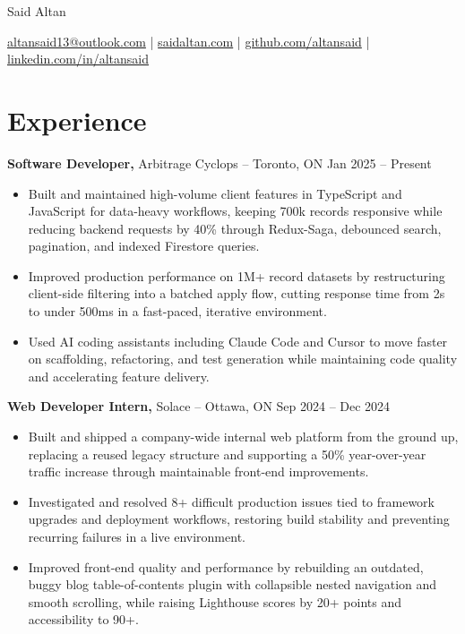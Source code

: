 \documentclass[11pt]{article}       %
\begin{document}
\centerline{\Huge Said Altan}

\vspace{10pt}

\centerline{\href{mailto:altansaid13@outlook.com}{altansaid13@outlook.com} | \href{https://saidaltan.com}{saidaltan.com} | \href{https://github.com/altansaid}{github.com/altansaid} | \href{https://www.linkedin.com/in/altansaid}{linkedin.com/in/altansaid}}


\vspace{5pt}
\section*{Experience}
\textbf{Software Developer,} {Arbitrage Cyclops} -- Toronto, ON \hfill Jan 2025 -- Present \\
\vspace{-9pt}
\begin{itemize}
  \item Built and maintained high-volume client features in TypeScript and JavaScript for data-heavy workflows, keeping 700k records responsive while reducing backend requests by 40\% through Redux-Saga, debounced search, pagination, and indexed Firestore queries.
  \item Improved production performance on 1M+ record datasets by restructuring client-side filtering into a batched apply flow, cutting response time from 2s to under 500ms in a fast-paced, iterative environment.
  \item Used AI coding assistants including Claude Code and Cursor to move faster on scaffolding, refactoring, and test generation while maintaining code quality and accelerating feature delivery.
\end{itemize}

\textbf{Web Developer Intern,} {Solace} -- Ottawa, ON \hfill Sep 2024 -- Dec 2024 \\
\vspace{-9pt}
\begin{itemize}
  \item Built and shipped a company-wide internal web platform from the ground up, replacing a reused legacy structure and supporting a 50\% year-over-year traffic increase through maintainable front-end improvements.
  \item Investigated and resolved 8+ difficult production issues tied to framework upgrades and deployment workflows, restoring build stability and preventing recurring failures in a live environment.
  \item Improved front-end quality and performance by rebuilding an outdated, buggy blog table-of-contents plugin with collapsible nested navigation and smooth scrolling, while raising Lighthouse scores by 20+ points and accessibility to 90+.
\end{itemize}
\end{document}
